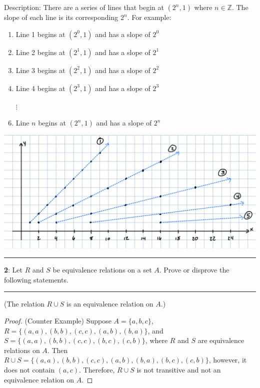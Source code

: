 \documentclass[11pt]{article}
\newcommand\question[2]{\vspace{.25in}\hrule\textbf{#1}: #2\vspace{.5em}\hrule\vspace{.10in}}
\renewcommand\part[1]{\vspace{.10in}(#1)\par}
\newcommand{\Z}{\mathbb{Z}}
\begin{document}
Description: There are a series of lines that begin at $(2^n, 1)$ where $n \in \Z$. The slope of each line is its corresponding $2^n$. For example:
\begin{enumerate}[label=\arabic*:]
 	\item Line 1 begins at $(2^0,1)$ and has a slope of $2^0$
 	\item Line 2 begins at $(2^1, 1)$ and has a slope of $2^1$
 	\item Line 3 begins at $(2^2, 1)$ and has a slope of $2^2$
 	\item Line 4 begins at $(2^3,1)$ and has a slope of $2^3$
 	\item[{$\vdots$}]
 	\item Line $n$ begins at $(2^n, 1)$ and has a slope of $2^n$
 \end{enumerate}

\includegraphics[width=1.0\textwidth]{images/1part2desc.png}
\pagebreak
\question{2}{Let $R$ and $S$ be equivalence relations on a set $A$. Prove or disprove the following statements.}

\part{The relation $R \cup S$ is an equivalence relation on $A$.}
\begin{proof}
	(Counter Example) Suppose $A = \{a, b, c\}$, $R=\{(a,a), (b,b), (c,c), (a,b), (b,a)\}$, and $S=\{(a,a),(b,b),(c,c),(b,c),(c,b)\}$, where $R$ and $S$ are equivalence relations on $A$. Then $R \cup S = \{(a,a),(b,b),(c,c),(a,b),(b,a),(b,c),(c,b)\}$, however, it does not contain $(a,c)$. Therefore, $R \cup S$ is not transitive and not an equivalence relation on $A$.
\end{proof}
\end{document}
